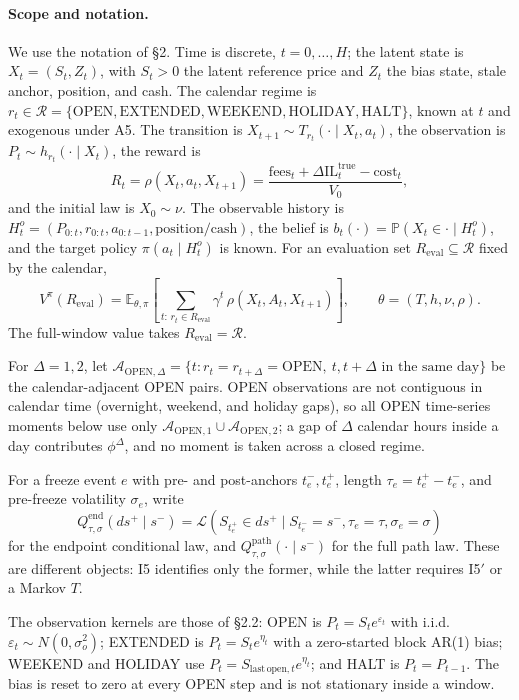 \paragraph{Scope and notation.}
We use the notation of \S2.  Time is discrete, $t=0,\dots,H$; the latent state is
$X_t=(S_t,Z_t)$, with $S_t>0$ the latent reference price and $Z_t$ the bias
state, stale anchor, position, and cash.  The calendar regime is
$r_t\in\mathcal R=\{\mathrm{OPEN},\mathrm{EXTENDED},\mathrm{WEEKEND},
\mathrm{HOLIDAY},\mathrm{HALT}\}$, known at $t$ and exogenous under A5.  The
transition is $X_{t+1}\sim T_{r_t}(\cdot\mid X_t,a_t)$, the observation is
$P_t\sim h_{r_t}(\cdot\mid X_t)$, the reward is
\[
R_t=\rho(X_t,a_t,X_{t+1})
=\frac{\text{fees}_t+\Delta\mathrm{IL}^{\mathrm{true}}_t-\text{cost}_t}{V_0},
\]
and the initial law is $X_0\sim\nu$.  The observable history is
$H_t^o=(P_{0:t},r_{0:t},a_{0:t-1},\text{position/cash})$, the belief is
$b_t(\cdot)=\mathbb P(X_t\in\cdot\mid H_t^o)$, and the target policy
$\pi(a_t\mid H_t^o)$ is known.  For an evaluation set
$R_{\mathrm{eval}}\subseteq\mathcal R$ fixed by the calendar,
\[
V^\pi(R_{\mathrm{eval}})
=\mathbb E_{\theta,\pi}\!\left[
\sum_{t:\,r_t\in R_{\mathrm{eval}}}\gamma^t\,\rho(X_t,A_t,X_{t+1})
\right],
\qquad \theta=(T,h,\nu,\rho).
\]
The full-window value takes $R_{\mathrm{eval}}=\mathcal R$.

For $\Delta=1,2$, let
$\mathcal A_{\mathrm{OPEN},\Delta}=\{t:r_t=r_{t+\Delta}=\mathrm{OPEN},\ t,t+\Delta
\text{ in the same day}\}$ be the calendar-adjacent OPEN pairs.  OPEN
observations are not contiguous in calendar time (overnight, weekend, and
holiday gaps), so all OPEN time-series moments below use only
$\mathcal A_{\mathrm{OPEN},1}\cup\mathcal A_{\mathrm{OPEN},2}$; a gap of
$\Delta$ calendar hours inside a day contributes $\phi^\Delta$, and no moment
is taken across a closed regime.

For a freeze event $e$ with pre- and post-anchors $t_e^-,t_e^+$, length
$\tau_e=t_e^+-t_e^-$, and pre-freeze volatility $\sigma_e$, write
\[
Q^{\mathrm{end}}_{\tau,\sigma}(ds^+\mid s^-)
=\mathcal L(S_{t_e^+}\in ds^+\mid S_{t_e^-}=s^-,\tau_e=\tau,\sigma_e=\sigma)
\]
for the endpoint conditional law, and
$Q^{\mathrm{path}}_{\tau,\sigma}(\cdot\mid s^-)$ for the full path law.  These
are different objects: I5 identifies only the former, while the latter requires
I5$'$ or a Markov $T$.

The observation kernels are those of \S2.2: OPEN is
$P_t=S_t e^{\varepsilon_t}$ with i.i.d.\
$\varepsilon_t\sim N(0,\sigma_o^2)$; EXTENDED is $P_t=S_t e^{\eta_t}$ with a
zero-started block AR(1) bias; WEEKEND and HOLIDAY use
$P_t=S_{\mathrm{last\,open},t}e^{\eta_t}$; and HALT is $P_t=P_{t-1}$.  The bias
is reset to zero at every OPEN step and is not stationary inside a window.

